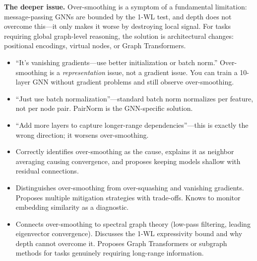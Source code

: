 \begin{interviewq}
\textbf{The deeper issue.} Over-smoothing is a symptom of a fundamental limitation: message-passing GNNs are bounded by the 1-WL test, and depth does not overcome this---it only makes it worse by destroying local signal. For tasks requiring global graph-level reasoning, the solution is architectural changes: positional encodings, virtual nodes, or Graph Transformers.

\redflags
\begin{itemize}
    \item ``It's vanishing gradients---use better initialization or batch norm.'' Over-smoothing is a \textit{representation} issue, not a gradient issue. You can train a 10-layer GNN without gradient problems and still observe over-smoothing.
    \item ``Just use batch normalization''---standard batch norm normalizes per feature, not per node pair. PairNorm is the GNN-specific solution.
    \item ``Add more layers to capture longer-range dependencies''---this is exactly the wrong direction; it worsens over-smoothing.
\end{itemize}


\goodgreat
\begin{itemize}
    \item {} Correctly identifies over-smoothing as the cause, explains it as neighbor averaging causing convergence, and proposes keeping models shallow with residual connections.
    \item {} Distinguishes over-smoothing from over-squashing and vanishing gradients. Proposes multiple mitigation strategies with trade-offs. Knows to monitor embedding similarity as a diagnostic.
    \item {} Connects over-smoothing to spectral graph theory (low-pass filtering, leading eigenvector convergence). Discusses the 1-WL expressivity bound and why depth cannot overcome it. Proposes Graph Transformers or subgraph methods for tasks genuinely requiring long-range information.
\end{itemize}

\end{interviewq}

